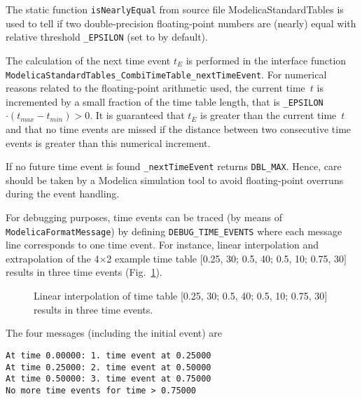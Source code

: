 \documentclass[11pt,a4paper,twocolumn]{article}
\begin{document}
The static function \texttt{isNearlyEqual} from source file Mod\-el\-ica\-Stand\-ard\-Ta\-bles is used to tell if two double-precision floating-point numbers are (nearly) equal with relative threshold \texttt{\_EPSILON} (set to  by default).

The calculation of the next time event $t_E$ is performed in the interface function \texttt{Mod\-el\-ica\-Standard\-Tables\_\-Combi\-Time\-Table\_\-next\-Time\-Event}. For numerical reasons related to the floating-point arithmetic used, the current time~$t$ is incremented by a small fraction of the time table length, that is \texttt{\_EPSILON}$\cdot(t_{max}-t_{min})>0$. It is guaranteed that $t_E$ is greater than the current time~$t$ and that no time events are missed if the distance between two consecutive time events is greater than this numerical increment.

If no future time event is found \texttt{\_next\-Time\-Event} returns \texttt{DBL\_MAX}. Hence, care should be taken by a Mod\-el\-ica simulation tool to avoid floating-point overruns during the event handling.

For debugging purposes, time events can be traced (by means of \texttt{Mod\-el\-ica\-Format\-Message}) by defining \texttt{DEBUG\_\-TIME\_\-EVENTS} where each message line corresponds to one time event. For instance, linear interpolation and extrapolation of the 4$\times$2 example time table $[$0.25, 30; 0.5, 40; 0.5, 10; 0.75, 30$]$ results in three time events (Fig.~\ref{fig:lininex}).

\begin{figure}[!hb]
\centering
{}
\caption{Linear interpolation of time table $[$0.25, 30; 0.5, 40; 0.5, 10; 0.75, 30$]$ results in three time events.}
\label{fig:lininex}
\end{figure}

The four messages (including the initial event) are
\begin{verbatim}
At time 0.00000: 1. time event at 0.25000
At time 0.25000: 2. time event at 0.50000
At time 0.50000: 3. time event at 0.75000
No more time events for time > 0.75000
\end{verbatim}
\end{document}
